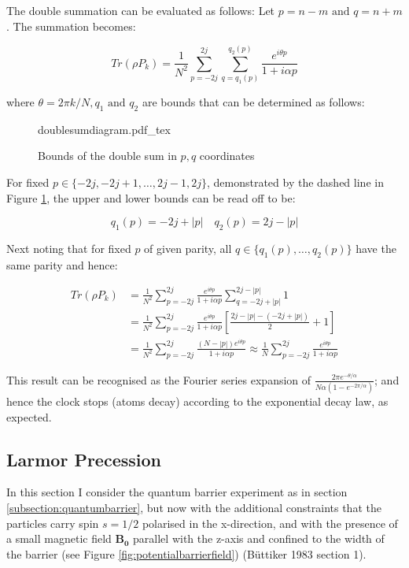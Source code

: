 \documentclass{article}
\newcommand{\incfig}[1]{%
    \def\svgwidth{10cm}
    {#1.pdf_tex}
}
\begin{document}
\noindent The double summation can be evaluated as follows: Let $p=n-m \text{ and } q=n+m$. The summation becomes:

\begin{equation}
	Tr(\rho P_k) = \frac{1}{N^2}\sum_{p=-2j}^{2j}\sum_{q=q_1(p)}^{q_2(p)}\frac{e^{i\theta p}}{1+i\alpha p}
\end{equation}

\noindent where $\theta = 2\pi k/N, q_1 \text{ and } q_2$ are bounds that can be determined as follows:

\begin{figure}[ht]
    \centering
    \incfig{doublesumdiagram}
    \caption{Bounds of the double sum in $p,q$ coordinates}
    \label{fig:doublesumdiagram}
\end{figure}

\noindent For fixed $p \in \{-2j,-2j+1,\dots,2j-1,2j\}$, demonstrated by the dashed line in Figure \ref{fig:doublesumdiagram}, the upper and lower bounds can be read off to be:

\begin{equation}
	q_1(p)=-2j+|p| \quad q_2(p)=2j-|p|
\end{equation}

\noindent Next noting that for fixed $p$ of given parity, all $q \in \{q_1(p),\dots,q_2(p)\}$ have the same parity and hence:

\begin{subequations}
\begin{align}
	Tr(\rho P_k) &= \frac{1}{N^2}\sum_{p=-2j}^{2j}\frac{e^{i\theta p}}{1+i\alpha p}\sum_{q=-2j+|p|}^{2j-|p|}1 \\
		     &= \frac{1}{N^2}\sum_{p=-2j}^{2j}\frac{e^{i\theta p}}{1+i\alpha p}\left[\frac{2j-|p|-(-2j+|p|)}{2}+1\right] \\
		     &= \frac{1}{N^2}\sum_{p=-2j}^{2j}\frac{(N-|p|)e^{i\theta p}}{1+i\alpha p} \approx \frac{1}{N}\sum_{p=-2j}^{2j}\frac{e^{i\theta p}}{1+i\alpha p}
\end{align}
\end{subequations}

\noindent This result can be recognised as the Fourier series expansion of $\frac{2\pi e^{-\theta/\alpha}}{N\alpha\left(1-e^{-2\pi/\alpha}\right)}$; and hence the clock stops (atoms decay) according to the exponential decay law, as expected.

\subsection{Larmor Precession}
\label{subsection:larmorprecession}
In this section I consider the quantum barrier experiment as in section \ref{subsection:quantumbarrier}, but now with the additional constraints that the particles carry spin $s=1/2$ polarised in the x-direction, and with the presence of a small magnetic field $\boldsymbol{B_0}$ parallel with the z-axis and confined to the width of the barrier (see Figure \ref{fig:potentialbarrierfield}) (B{\"u}ttiker 1983 section 1).
\end{document}
